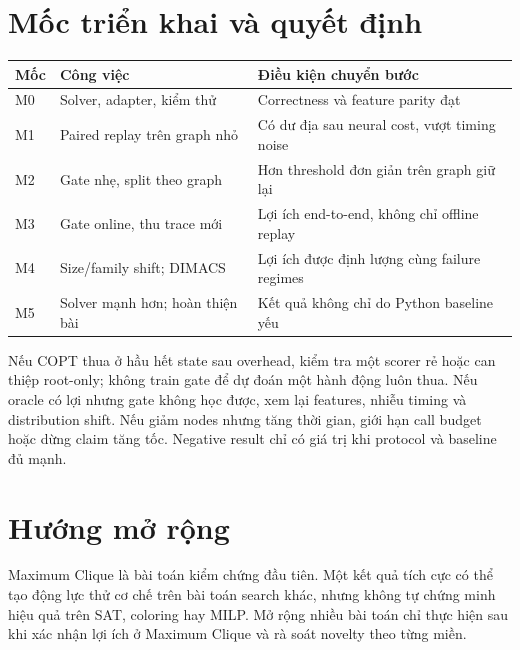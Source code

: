 \documentclass[11pt,a4paper]{article}
\begin{document}
\section{Mốc triển khai và quyết định}
\begin{tabularx}{\linewidth}{lXX}
\toprule
Mốc & Công việc & Điều kiện chuyển bước\\
\midrule
M0 & Solver, adapter, kiểm thử & Correctness và feature parity đạt\\
M1 & Paired replay trên graph nhỏ & Có dư địa sau neural cost, vượt timing noise\\
M2 & Gate nhẹ, split theo graph & Hơn threshold đơn giản trên graph giữ lại\\
M3 & Gate online, thu trace mới & Lợi ích end-to-end, không chỉ offline replay\\
M4 & Size/family shift; DIMACS & Lợi ích được định lượng cùng failure regimes\\
M5 & Solver mạnh hơn; hoàn thiện bài & Kết quả không chỉ do Python baseline yếu\\
\bottomrule
\end{tabularx}

Nếu COPT thua ở hầu hết state sau overhead, kiểm tra một scorer rẻ hoặc can thiệp root-only; không train gate để dự đoán một hành động luôn thua. Nếu oracle có lợi nhưng gate không học được, xem lại features, nhiễu timing và distribution shift. Nếu giảm nodes nhưng tăng thời gian, giới hạn call budget hoặc dừng claim tăng tốc. Negative result chỉ có giá trị khi protocol và baseline đủ mạnh.

\section{Hướng mở rộng}
Maximum Clique là bài toán kiểm chứng đầu tiên. Một kết quả tích cực có thể tạo động lực thử cơ chế trên bài toán search khác, nhưng không tự chứng minh hiệu quả trên SAT, coloring hay MILP. Mở rộng nhiều bài toán chỉ thực hiện sau khi xác nhận lợi ích ở Maximum Clique và rà soát novelty theo từng miền.



\end{document}
